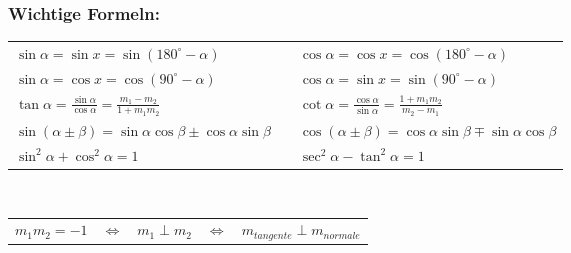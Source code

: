 \subsubsection{Wichtige Formeln:}
\renewcommand{\arraystretch}{1.6}
\begin{tabular}{lll}
    $ \sin\alpha = \sin x = \sin (180^\circ-\alpha)$ & & $ \cos\alpha = \cos x = \cos(180^\circ-\alpha)$\\
    $ \sin\alpha = \cos x = \cos (90^\circ-\alpha)$ & & $ \cos\alpha = \sin x = \sin(90^\circ-\alpha)$\\
    $ \tan\alpha = \frac{\sin\alpha}{\cos\alpha} = \frac{m_1-m_2}{1+m_1m_2}$ & & $\cot\alpha = \frac{\cos\alpha}{\sin\alpha}= \frac{1+m_1m_2}{m_2-m_1}$\\
    $ \sin(\alpha \pm \beta) = \sin\alpha\cos\beta \pm \cos\alpha\sin\beta$ & & $ \cos(\alpha \pm \beta) = \cos\alpha\sin\beta \mp \sin\alpha\cos\beta$\\
    $ \sin^2 \alpha + \cos^2 \alpha = 1$ & &$ \sec^2 \alpha - \tan^2 \alpha = 1$
\end{tabular}\\
\begin{tabular}{l}
    $m_1 m_2 = -1 \quad \Longleftrightarrow \quad m_1 \perp m_2 \quad \Longleftrightarrow \quad m_{tangente} \perp m_{normale}$ 
\end{tabular}

